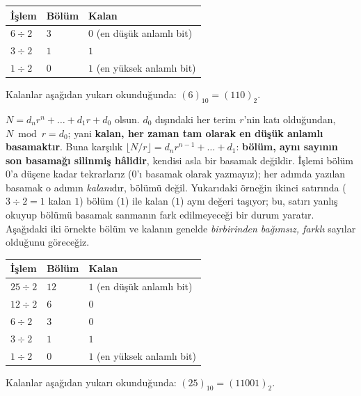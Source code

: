 \begin{ornek}
\begin{center}
\begin{tabular}{lll}
\toprule
İşlem & Bölüm & Kalan \\
\midrule
$6 \div 2$ & $3$ & $0$ (en düşük anlamlı bit) \\
$3 \div 2$ & $1$ & $1$ \\
$1 \div 2$ & $0$ & $1$ (en yüksek anlamlı bit) \\
\bottomrule
\end{tabular}
\end{center}
Kalanlar aşağıdan yukarı okunduğunda: $(6)_{10} = (110)_2$.
\end{ornek}

\begin{bilginot}
$N = d_n r^n+\ldots+d_1 r+d_0$ olsun. $d_0$ dışındaki her terim $r$'nin katı olduğundan,
$N \bmod r = d_0$; yani \textbf{kalan, her zaman tam olarak en düşük anlamlı basamaktır}.
Buna karşılık $\lfloor N/r\rfloor = d_n r^{n-1}+\ldots+d_1$: \textbf{bölüm, aynı sayının son
basamağı silinmiş hâlidir}, kendisi asla bir basamak değildir. İşlemi bölüm $0$'a düşene kadar
tekrarlarız ($0$'ı basamak olarak yazmayız); her adımda yazılan basamak o adımın
\emph{kalanı}dır, bölümü değil. Yukarıdaki örneğin ikinci satırında ($3\div2=1$ kalan $1$)
bölüm ($1$) ile kalan ($1$) aynı değeri taşıyor; bu, satırı yanlış okuyup bölümü basamak
sanmanın fark edilmeyeceği bir durum yaratır. Aşağıdaki iki örnekte bölüm ve kalanın genelde
\emph{birbirinden bağımsız, farklı} sayılar olduğunu göreceğiz.
\end{bilginot}

\begin{ornek}
\begin{center}
\begin{tabular}{lll}
\toprule
İşlem & Bölüm & Kalan \\
\midrule
$25 \div 2$ & $12$ & $1$ (en düşük anlamlı bit) \\
$12 \div 2$ & $6$ & $0$ \\
$6 \div 2$ & $3$ & $0$ \\
$3 \div 2$ & $1$ & $1$ \\
$1 \div 2$ & $0$ & $1$ (en yüksek anlamlı bit) \\
\bottomrule
\end{tabular}
\end{center}
Kalanlar aşağıdan yukarı okunduğunda: $(25)_{10} = (11001)_2$.
\end{ornek}

